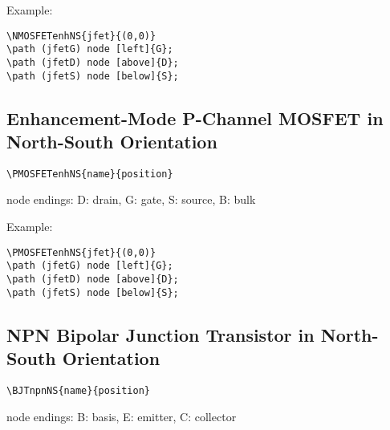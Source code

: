 \documentclass[parskip=full]{scrartcl}
\begin{document}
Example:\\
\begin{minipage}{0.8\textwidth}
\begin{verbatim}
\NMOSFETenhNS{jfet}{(0,0)}
\path (jfetG) node [left]{G};
\path (jfetD) node [above]{D};
\path (jfetS) node [below]{S};
\end{verbatim}
\end{minipage}
\begin{minipage}{0.19\textwidth}
\end{minipage}

\subsection{Enhancement-Mode P-Channel MOSFET in North-South Orientation}

\begin{verbatim}
\PMOSFETenhNS{name}{position}
\end{verbatim}
node endings: D: drain, G: gate, S: source, B: bulk

Example:\\
\begin{minipage}{0.8\textwidth}
\begin{verbatim}
\PMOSFETenhNS{jfet}{(0,0)}
\path (jfetG) node [left]{G};
\path (jfetD) node [above]{D};
\path (jfetS) node [below]{S};
\end{verbatim}
\end{minipage}
\begin{minipage}{0.19\textwidth}
\end{minipage}

\subsection{NPN Bipolar Junction Transistor in North-South Orientation}

\begin{verbatim}
\BJTnpnNS{name}{position}
\end{verbatim}
node endings: B: basis, E: emitter, C: collector
\end{document}
